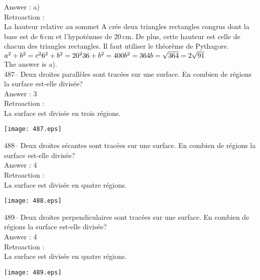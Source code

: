 ﻿\documentclass[letterpaper, 12pt]{article}
\begin{document}
Answer : a)\\

Retroaction : \\
La hauteur relative au sommet A cr\'ee deux triangles rectangles congrus
dont la base est de 6\,cm et l'hypot\'enuse de 20\,cm.  De plus, cette
hauteur est celle de chacun des triangles rectangles.  Il faut utiliser le
th\'eor\`eme de Pythagore.\\
$a^{2}+b^{2}=c^{2}\\
6^{2}+b^{2}=20^{2}\\
36+b^{2}=400\\
b^{2}=364\\
b=\sqrt{364}=2\sqrt{91}$\\
The answer is a).\\

487-- Deux droites parall\`eles sont trac\'ees sur une surface.  En combien
de r\'egions la surface est-elle divis\'ee?\\

Answer : 3\\

Retroaction : \\
La surface est divis\'ee en trois r\'egions.\\
\begin{center}
\texttt{[image: 487.eps]}
\end{center}

488-- Deux droites s\'ecantes sont trac\'ees sur une surface.  En combien de
r\'egions la surface est-elle divis\'ee?\\

Answer : 4\\

Retroaction : \\
La surface est divis\'ee en quatre r\'egions.\\
\begin{center}
\texttt{[image: 488.eps]}
\end{center}

489-- Deux droites perpendiculaires sont trac\'ees sur une surface.  En
combien de r\'egions la surface est-elle divis\'ee?\\

Answer : 4\\

Retroaction :\\
La surface est divis\'ee en quatre r\'egions.\\
\begin{center}
\texttt{[image: 489.eps]}
\end{center}
\end{document}
